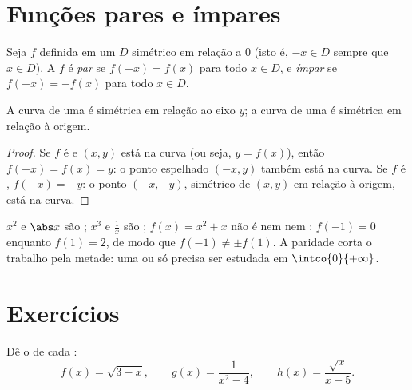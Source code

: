 \section{Funções pares e ímpares}

\begin{definition}[Paridade]\label{def:g11:func:parity}
Seja $f$ definida em um  $D$ simétrico em relação a $0$ (isto é,
$-x \in D$ sempre que $x \in D$). A  $f$ é
\emph{par} se $f(-x) = f(x)$ para todo $x \in D$, e
\emph{ímpar} se $f(-x) = -f(x)$ para todo $x \in D$.
\end{definition}

\begin{proposition}\label{prop:g11:func:paritysym}
A curva de uma  é simétrica em relação ao eixo $y$; a curva de
uma  é simétrica em relação à origem.
\end{proposition}

\begin{proof}
Se $f$ é  e $(x, y)$ está na curva (ou seja, $y = f(x)$), então
$f(-x) = f(x) = y$: o ponto espelhado $(-x, y)$ também está na curva. Se
$f$ é , $f(-x) = -y$: o ponto $(-x, -y)$, simétrico de $(x,y)$ em
relação à origem, está na curva.
\end{proof}

\begin{example}
$x^2$ e $\abs x$ são ; $x^3$ e $\frac1x$ são ;
$f(x) = x^2 + x$ não é nem  nem : $f(-1) = 0$ enquanto
$f(1) = 2$, de modo que $f(-1) \neq \pm f(1)$. A paridade corta o
trabalho pela metade: uma  ou  só precisa ser estudada em
$\intco{0}{+\infty}$.
\end{example}

\section{Exercícios}

\begin{exercise}[$\star$]\label{exo:g11:func:1}
Dê o  de cada :
\[
f(x) = \sqrt{3 - x}, \qquad
g(x) = \frac{1}{x^2 - 4}, \qquad
h(x) = \frac{\sqrt{x}}{x - 5} .
\]
\end{exercise}

